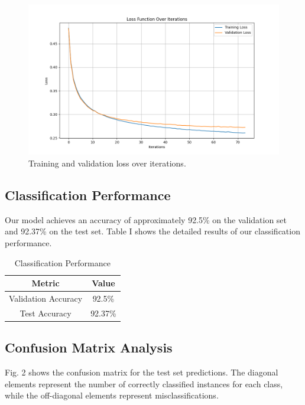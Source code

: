 \documentclass[10pt,journal,compsoc]{IEEEtran}
\begin{document}
\begin{figure}[htbp]
\centering
\includegraphics[width=0.8\linewidth]{img/lossfunction.png}
\caption{Training and validation loss over iterations.}
\label{fig:loss_curve}
\end{figure}

\subsection{Classification Performance}
Our model achieves an accuracy of approximately 92.5\% on the validation set and 92.37\% on the test set. Table I shows the detailed results of our classification performance.

\begin{table}[htbp]
\caption{Classification Performance}
\begin{center}
\begin{tabular}{|c|c|}
\hline
\textbf{Metric} & \textbf{Value} \\
\hline
Validation Accuracy & 92.5\% \\
\hline
Test Accuracy & 92.37\% \\
\hline
\end{tabular}
\end{center}
\label{tab:performance}
\end{table}

\subsection{Confusion Matrix Analysis}
Fig. 2 shows the confusion matrix for the test set predictions. The diagonal elements represent the number of correctly classified instances for each class, while the off-diagonal elements represent misclassifications.
\end{document}
